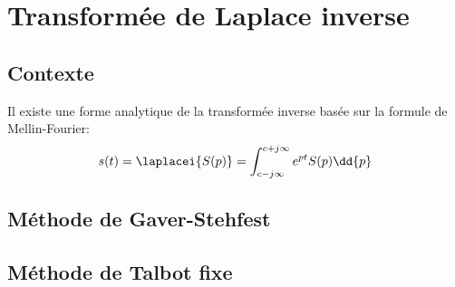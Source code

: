 \chapter{Transformée de Laplace inverse~\label{annexe-invL}}

\section{Contexte}

Il existe une forme analytique de la transformée inverse basée sur                                                            
la formule de Mellin-Fourier\cite{Ostertag}:                                                                                  
$$                                                                                                                            
s(t)=\laplacei{S(p)}=\int_{c-j\infty}^{c+j\infty} e^{pt}S(p)\dd{p}                                                            
$$    

\section{Méthode de Gaver-Stehfest}

\section{Méthode de Talbot fixe}
